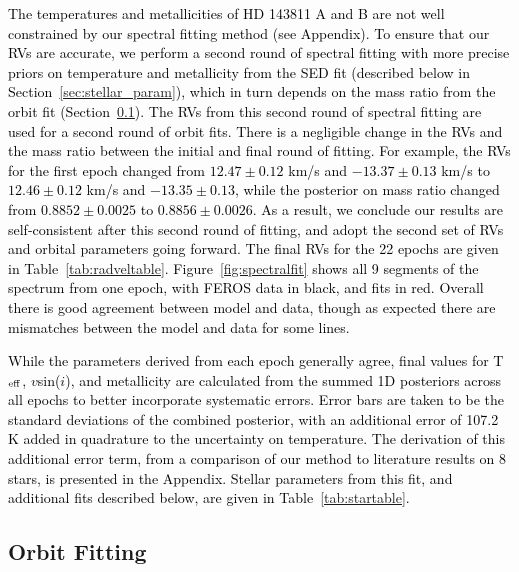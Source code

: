 \documentclass[]{aastex701} %
\begin{document}
\textcolor{black}{The temperatures and metallicities of HD 143811 A and B are not well constrained by our spectral fitting method (see Appendix). To ensure that our RVs are accurate, we perform a second round of spectral fitting with more precise priors on temperature and metallicity from the SED fit (described below in Section~\ref{sec:stellar_param}), which in turn depends on the mass ratio from the orbit fit (Section~\ref{sec:orbit_fit}). The RVs from this second round of spectral fitting are used for a second round of orbit fits. There is a negligible change in the RVs and the mass ratio between the initial and final round of fitting. For example, the RVs for the first epoch changed from $12.47 \pm 0.12$ km/s and $-13.37 \pm 0.13$ km/s to $12.46 \pm 0.12$ km/s and $-13.35 \pm 0.13$, while the posterior on mass ratio changed from $0.8852 \pm 0.0025$ to $0.8856 \pm 0.0026$. As a result, we conclude our results are self-consistent after this second round of fitting, and adopt the second set of RVs and orbital parameters going forward. The final RVs for the 22 epochs are given in Table~\ref{tab:radveltable}. 
Figure~\ref{fig:spectralfit} shows all 9 segments of the spectrum from one epoch, with FEROS data in black, and fits in red. Overall there is good agreement between model and data, though as expected there are mismatches between the model and data for some lines.
}

\textcolor{black}{While the parameters derived from each epoch generally agree, final values for T$_{\rm eff}$, $v$sin($i$), and metallicity are calculated from the summed 1D posteriors across all epochs to better incorporate systematic errors. Error bars are taken to be the standard deviations of the combined posterior, with an additional error of 107.2 K added in quadrature to the uncertainty on temperature. The derivation of this additional error term, from a comparison of our method to literature results on 8 stars, is presented in the Appendix. Stellar parameters from this fit, and additional fits described below, are given in Table~\ref{tab:startable}.}

 

 \subsection{Orbit Fitting}\label{sec:orbit_fit}
\end{document}
